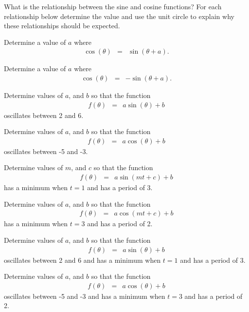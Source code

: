 \begin{problem}
  \clearpage

\item What is the relationship between the sine and cosine functions?
  For each relationship below determine the value and use the unit
  circle to explain why these relationships should be expected.
  \begin{subproblem}
  \item Determine a value of $a$ where
    \begin{eqnarray*}
      \cos(\theta) & = & \sin(\theta+a).
    \end{eqnarray*}
    \vfill
  \item Determine a value of $a$ where
    \begin{eqnarray*}
      \cos(\theta) & = & -\sin(\theta+a).
    \end{eqnarray*}
    \vfill
  \end{subproblem}
    \clearpage

  \item Determine values of $a$, and $b$ so that the function
    \begin{eqnarray*}
      f(\theta) & = & a\sin(\theta)+b
    \end{eqnarray*}
    oscillates between 2 and 6.
    \vfill

  \item Determine values of $a$, and $b$ so that the function
    \begin{eqnarray*}
      f(\theta) & = & a\cos(\theta)+b
    \end{eqnarray*}
    oscillates between -5 and -3.
    \vfill

\clearpage

\item Determine values of $m$, and $c$ so that the function
  \begin{eqnarray*}
    f(\theta) & = & a\sin(mt+c)+b
  \end{eqnarray*}
  has a minimum when $t=1$ and has a period of 3.
  \vfill

\item Determine values of $a$, and $b$ so that the function
  \begin{eqnarray*}
    f(\theta) & = & a\cos(mt+c)+b
  \end{eqnarray*}
  has a minimum when $t=3$ and has a period of 2.
  \vfill

\clearpage

\item Determine values of $a$, and $b$ so that the function
  \begin{eqnarray*}
    f(\theta) & = & a\sin(\theta)+b
  \end{eqnarray*}
  oscillates between 2 and 6 and has a minimum when $t=1$ and has a period of 3.
  \vfill

\item Determine values of $a$, and $b$ so that the function
  \begin{eqnarray*}
    f(\theta) & = & a\cos(\theta)+b
  \end{eqnarray*}
  oscillates between -5 and -3 and has a minimum when $t=3$ and has a period of 2.
  \vfill

\end{problem}

